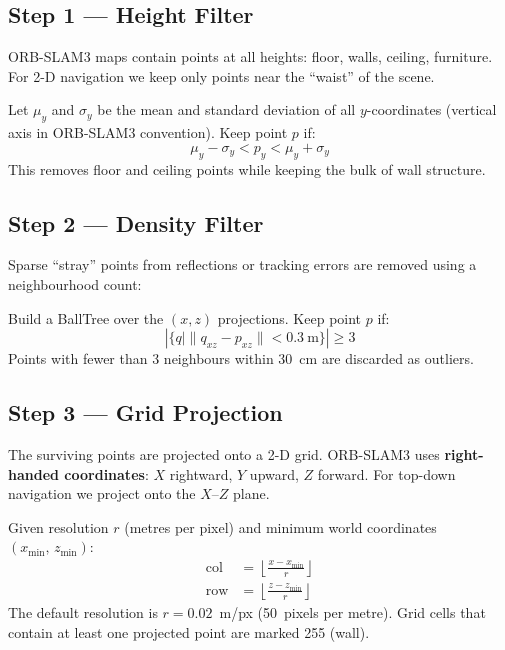 \documentclass[12pt,a4paper]{article}
\begin{document}
\subsection{Step 1 --- Height Filter}

ORB-SLAM3 maps contain points at all heights: floor, walls, ceiling, furniture.
For 2-D navigation we keep only points near the ``waist'' of the scene.

\begin{tcolorbox}[formulabox, title={Height Filter}]
Let $\mu_y$ and $\sigma_y$ be the mean and standard deviation of all
$y$-coordinates (vertical axis in ORB-SLAM3 convention). Keep point $p$ if:
\[
  \mu_y - \sigma_y < p_y < \mu_y + \sigma_y
\]
This removes floor and ceiling points while keeping the bulk of wall structure.
\end{tcolorbox}

\subsection{Step 2 --- Density Filter}

Sparse ``stray'' points from reflections or tracking errors are removed using a
neighbourhood count:

\begin{tcolorbox}[formulabox, title={Density Filter}]
Build a BallTree over the $(x, z)$ projections. Keep point $p$ if:
\[
  |\{q \mid \|q_{xz} - p_{xz}\| < 0.3~\text{m}\}| \geq 3
\]
Points with fewer than 3 neighbours within 30~cm are discarded as outliers.
\end{tcolorbox}

\subsection{Step 3 --- Grid Projection}

The surviving points are projected onto a 2-D grid.
ORB-SLAM3 uses \textbf{right-handed coordinates}: $X$ rightward, $Y$ upward,
$Z$ forward. For top-down navigation we project onto the $X$--$Z$ plane.

\begin{tcolorbox}[formulabox, title={World-to-Grid Conversion}]
Given resolution $r$ (metres per pixel) and minimum world coordinates
$(x_{\min},\, z_{\min})$:
\begin{align}
  \mathrm{col} &= \left\lfloor \frac{x - x_{\min}}{r} \right\rfloor
  \label{eq:col} \\[4pt]
  \mathrm{row} &= \left\lfloor \frac{z - z_{\min}}{r} \right\rfloor
  \label{eq:row}
\end{align}
The default resolution is $r = 0.02$~m/px (50~pixels per metre).
Grid cells that contain at least one projected point are marked 255 (wall).
\end{tcolorbox}
\end{document}
